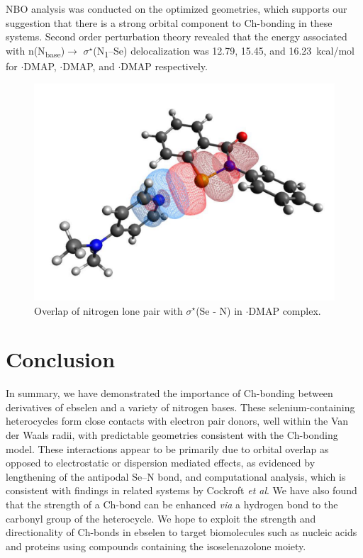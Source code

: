 \begin{refsection}
NBO analysis was conducted on the optimized geometries, which supports our suggestion that there is a strong orbital component to Ch-bonding in these systems.
Second order perturbation theory revealed that the energy associated with n(N\textsubscript{base})$\rightarrow$ $\sigma^{\star}$(N\textsubscript{1}--Se) delocalization was 12.79, 15.45, and 16.23~kcal/mol for $\cdot$DMAP, $\cdot$DMAP, and $\cdot$DMAP respectively.

\begin{figure}
  \centering
  \includegraphics[width=0.6\linewidth]{Figures/phenyl-dmap-overlap.pdf}
  \caption[Orbital overlap for $\cdot$DMAP.]{Overlap of nitrogen lone pair with $\sigma^{\star}$(Se - N) in $\cdot$DMAP complex.}
  \label{fig:phenyl-dmap-overlap}
\end{figure}

\section{Conclusion}
In summary, we have demonstrated the importance of Ch-bonding between derivatives of ebselen  and a variety of nitrogen bases.
These selenium-containing heterocycles form close contacts with electron pair donors, well within the Van der Waals radii, with predictable geometries consistent with the Ch-bonding model.
These interactions appear to be primarily due to orbital overlap as opposed to electrostatic or dispersion mediated effects, as evidenced by lengthening of the antipodal Se--N bond, and computational analysis, which is consistent with findings in related systems by Cockroft \emph{et al}.\autocite{Pascoe2017}
We have also found that the strength of a Ch-bond can be enhanced \emph{via} a hydrogen bond to the carbonyl group of the heterocycle.
We hope to exploit the strength and directionality of Ch-bonds in ebselen to target biomolecules such as nucleic acids and proteins using compounds containing the isoselenazolone moiety.


\end{refsection}
